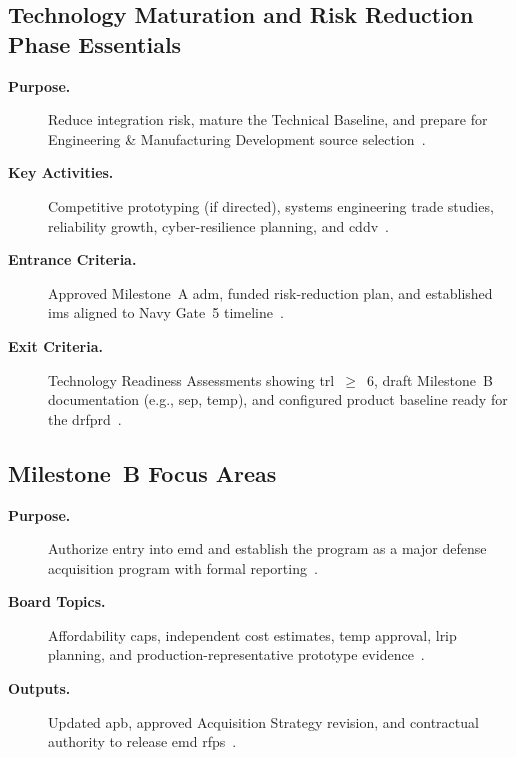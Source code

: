 \documentclass[../main.tex]{subfiles}
\begin{document}
\subsection{Technology Maturation and Risk Reduction Phase Essentials}
\begin{description}
	\item[\textbf{Purpose.}] Reduce integration risk, mature the Technical Baseline, and prepare for Engineering \& Manufacturing Development source selection~\autocite{DoDI5000-85}.
	\item[\textbf{Key Activities.}] Competitive prototyping (if directed), systems engineering trade studies, reliability growth, cyber-resilience planning, and \ac{cddv}~\autocite{DoDI5000-85}.
	\item[\textbf{Entrance Criteria.}] Approved Milestone~A \ac{adm}, funded risk-reduction plan, and established \ac{ims} aligned to Navy Gate~5 timeline~\autocite{DoDI5000-85,OPNAVINST5000-42E}.
	\item[\textbf{Exit Criteria.}] Technology Readiness Assessments showing \ac{trl}~$\geq$~6, draft Milestone~B documentation (e.g., \ac{sep}, \ac{temp}), and configured product baseline ready for the \ac{drfprd}~\autocite{DoDI5000-85}.
\end{description}

\subsection{Milestone~B Focus Areas}
\begin{description}
	\item[\textbf{Purpose.}] Authorize entry into \ac{emd} and establish the program as a major defense acquisition program with formal reporting~\autocite{DoDI5000-85}.
	\item[\textbf{Board Topics.}] Affordability caps, independent cost estimates, \ac{temp} approval, \ac{lrip} planning, and production-representative prototype evidence~\autocite{DoDI5000-85}.
	\item[\textbf{Outputs.}] Updated \ac{apb}, approved Acquisition Strategy revision, and contractual authority to release \ac{emd} \glspl{rfp}~\autocite{DoDI5000-85}.
\end{description}
\end{document}
